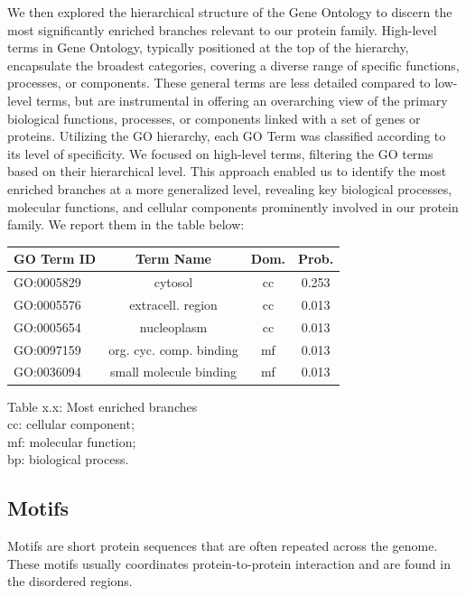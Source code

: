 \documentclass[10pt,twocolumn,letterpaper]{article}
\begin{document}
We then explored the hierarchical structure of the Gene Ontology to discern the most significantly enriched branches relevant to our protein family. High-level terms in Gene Ontology, typically positioned at the top of the hierarchy, encapsulate the broadest categories, covering a diverse range of specific functions, processes, or components. These general terms are less detailed compared to low-level terms, but are instrumental in offering an overarching view of the primary biological functions, processes, or components linked with a set of genes or proteins. 
Utilizing the GO hierarchy, each GO Term was classified according to its level of specificity. We focused on high-level terms, filtering the GO terms based on their hierarchical level. This approach enabled us to identify the most enriched branches at a more generalized level, revealing key biological processes, molecular functions, and cellular components prominently involved in our protein family. We report them in the table below:

\begin{center}
    \begin{tabular}{lccc}
        \toprule
        GO Term ID & Term Name & Dom. & Prob. \\
        \midrule
        GO:0005829	& \small{cytosol} & cc & 0.253 \\
        GO:0005576	& \small{extracell. region} & cc & 0.013 \\
        GO:0005654	& \small{nucleoplasm} &	cc & 0.013 \\
        GO:0097159	& \small{org. cyc. comp. binding} & mf	& 0.013 \\
        GO:0036094	& \small{small molecule binding} & mf & 0.013 \\
        \bottomrule
    \end{tabular}
\end{center} 
\begin{center}
    \small{Table x.x: Most enriched branches}\\
    \small{cc: cellular component; \\
            mf: molecular function; \\
            bp: biological process.}\\
    
\end{center}



\subsection{Motifs}
Motifs are short protein sequences that are often repeated across the genome. These motifs usually coordinates protein-to-protein interaction and are found in the disordered regions. 
\end{document}
